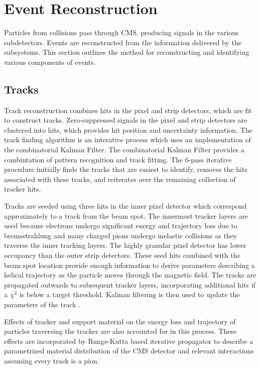 \chapter{Event Reconstruction}\label{ch:reco}
Particles from collisions pass through CMS, producing signals in the various subdetectors. Events are reconstructed from the information delivered by the subsystems. This section outlines the method for reconstructing and identifying various components of events.

\section{Tracks}
Track reconstruction combines hits in the pixel and strip detectors, which are fit to construct tracks. Zero-suppressed signals in the pixel and strip detectors are clustered into hits, which provides hit position and uncertainty information. The track finding algorithm is an interative process which uses an implementation of the combinatorial Kalman Filter. The combinatorial Kalman Filter provides a combintation of pattern recognition and track fitting. The 6-pass iterative procedure initially finds the tracks that are easiest to identify, removes the hits associated with these tracks, and reiterates over the remaining collection of tracker hits. \cite{Chatrchyan:2014fea}

Tracks are seeded using three hits in the inner pixel detector which correspond approximately to a track from the beam spot. The innermost tracker layers are used because electrons undergo significant energy and trajectory loss due to bremsstrahlung and many charged pions undergo inelastic collisions as they traverse the inner tracking layers. The highly granular pixel detector has lower occupancy than the outer strip detectors. These seed hits combined with the beam spot location provide enough information to derive parameters describing a helical trajectory as the particle moves through the magnetic field. The tracks are propagated outwards to subsequent tracker layers, incorporating additional hits if a $\chi^2$ is below a target threshold. Kalman filtering is then used to update the parameters of the track \cite{Adam:2005cg}. 

Effects of tracker and support material on the energy loss and trajectory of particles traversing the tracker are also accounted for in this process. These effects are incorporated by Runge-Kutta based iterative propagator to describe a parametrized material distribution of the CMS detector and relevant interactions assuming every track is a pion. 

